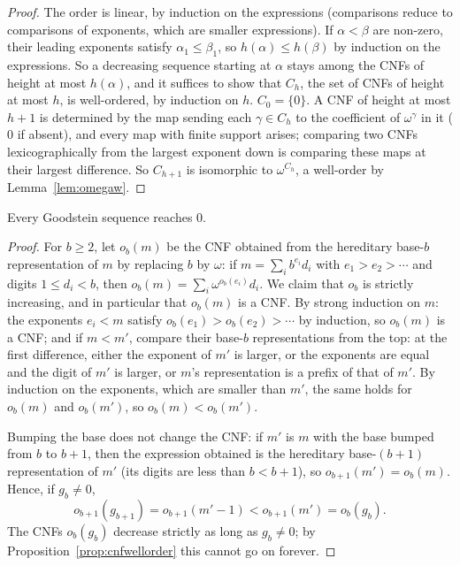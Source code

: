 \begin{proof}
The order is linear, by induction on the expressions (comparisons reduce to comparisons of exponents, which are smaller expressions). If $\alpha<\beta$ are non-zero, their leading exponents satisfy $\alpha_1\le\beta_1$, so $h(\alpha)\le h(\beta)$ by induction on the expressions. So a decreasing sequence starting at $\alpha$ stays among the CNFs of height at most $h(\alpha)$, and it suffices to show that $C_h$, the set of CNFs of height at most $h$, is well-ordered, by induction on $h$. $C_0=\{0\}$. A CNF of height at most $h+1$ is determined by the map sending each $\gamma\in C_h$ to the coefficient of $\omega^\gamma$ in it ($0$ if absent), and every map with finite support arises; comparing two CNFs lexicographically from the largest exponent down is comparing these maps at their largest difference. So $C_{h+1}$ is isomorphic to $\omega^{C_h}$, a well-order by Lemma~\ref{lem:omegaw}.
\end{proof}

\begin{theorem}[Goodstein, 1944]\label{thm:goodstein}
Every Goodstein sequence reaches $0$.
\end{theorem}

\begin{proof}
For $b\ge2$, let $o_b(m)$ be the CNF obtained from the hereditary base-$b$ representation of $m$ by replacing $b$ by $\omega$: if $m=\sum_ib^{e_i}d_i$ with $e_1>e_2>\cdots$ and digits $1\le d_i<b$, then $o_b(m)=\sum_i\omega^{o_b(e_i)}d_i$. We claim that $o_b$ is strictly increasing, and in particular that $o_b(m)$ is a CNF. By strong induction on $m$: the exponents $e_i<m$ satisfy $o_b(e_1)>o_b(e_2)>\cdots$ by induction, so $o_b(m)$ is a CNF; and if $m<m'$, compare their base-$b$ representations from the top: at the first difference, either the exponent of $m'$ is larger, or the exponents are equal and the digit of $m'$ is larger, or $m$'s representation is a prefix of that of $m'$. By induction on the exponents, which are smaller than $m'$, the same holds for $o_b(m)$ and $o_b(m')$, so $o_b(m)<o_b(m')$.

Bumping the base does not change the CNF: if $m'$ is $m$ with the base bumped from $b$ to $b+1$, then the expression obtained is the hereditary base-$(b+1)$ representation of $m'$ (its digits are less than $b<b+1$), so $o_{b+1}(m')=o_b(m)$. Hence, if $g_b\ne0$,
\[
o_{b+1}(g_{b+1})=o_{b+1}(m'-1)<o_{b+1}(m')=o_b(g_b).
\]
The CNFs $o_b(g_b)$ decrease strictly as long as $g_b\ne0$; by Proposition~\ref{prop:cnfwellorder} this cannot go on forever.
\end{proof}

